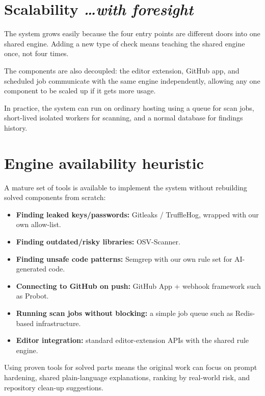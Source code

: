 \documentclass[11pt,a4paper]{article}
\newcommand{\BvrHint}[1]{%
  {\normalfont\normalsize\itshape\hfill #1}}
\begin{document}
\section{Scalability
  \BvrHint{\ldots with foresight}}

The system grows easily because the four entry points are different doors into one shared engine. Adding a new type of check means teaching the shared engine once, not four times.

The components are also decoupled: the editor extension, GitHub app, and scheduled job communicate with the same engine independently, allowing any one component to be scaled up if it gets more usage.

In practice, the system can run on ordinary hosting using a queue for scan jobs, short-lived isolated workers for scanning, and a normal database for findings history.

\section{Engine availability heuristic}

A mature set of tools is available to implement the system without rebuilding solved components from scratch:

\begin{itemize}[leftmargin=0.7cm]

    \item \textbf{Finding leaked keys/passwords:} Gitleaks / TruffleHog, wrapped with our own allow-list.

    \item \textbf{Finding outdated/risky libraries:} OSV-Scanner.

    \item \textbf{Finding unsafe code patterns:} Semgrep with our own rule set for AI-generated code.

    \item \textbf{Connecting to GitHub on push:} GitHub App + webhook framework such as Probot.

    \item \textbf{Running scan jobs without blocking:} a simple job queue such as Redis-based infrastructure.

    \item \textbf{Editor integration:} standard editor-extension APIs with the shared rule engine.

\end{itemize}

Using proven tools for solved parts means the original work can focus on prompt hardening, shared plain-language explanations, ranking by real-world risk, and repository clean-up suggestions.
\end{document}
